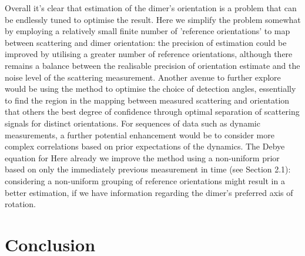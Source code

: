 Overall it’s clear that estimation of the dimer’s orientation 
is a problem that can be endlessly tuned to optimise the 
result. Here we simplify the problem somewhat by employing 
a relatively small finite number of 'reference orientations' 
to map between scattering and dimer orientation: the precision 
of estimation could be improved by utilising a greater number 
of reference orientations, although there remains a balance 
between the realisable precision of orientation estimate and 
the noise level of the scattering measurement. 
Another avenue to further explore would be using 
the method to optimise the choice of detection angles, 
essentially to find the region in the mapping between measured 
scattering and orientation that others the best degree of 
confidence through optimal separation of scattering signals 
for distinct orientations. For sequences of data such as 
dynamic measurements, a further potential enhancement would 
be to consider more complex correlations based on prior 
expectations of the dynamics. The Debye equation for  Here already we improve the 
method using a non-uniform prior based on only the immediately 
previous measurement in time (see Section 2.1): considering 
a non-uniform grouping of reference orientations might result 
in a better estimation, if we have information regarding the 
dimer’s preferred axis of rotation. 

\section{Conclusion}
\label{sec:Conclusion}

